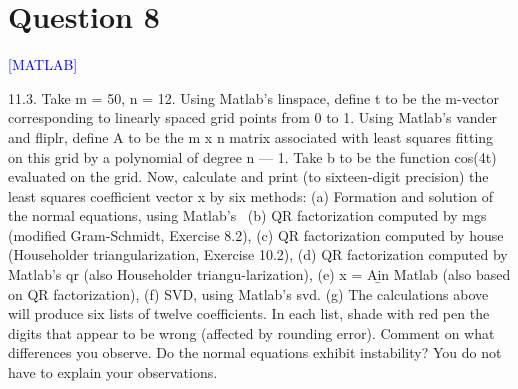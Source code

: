 \section*{Question 8}
\textcolor{blue}{[MATLAB]}

11.3. Take m = 50, n = 12. Using Matlab's linspace, define t to be the m-vector corresponding to linearly spaced grid points from 0 to 1. Using Matlab's vander and fliplr, define A to be the m x n matrix associated with least squares fitting on this grid by a polynomial of degree n — 1. Take b to be the function cos(4t) evaluated on the grid. Now, calculate and print (to sixteen-digit precision) the least squares coefficient vector x by six methods: (a) Formation and solution of the normal equations, using Matlab's \, (b) QR factorization computed by mgs (modified Gram-Schmidt, Exercise 8.2), (c) QR factorization computed by house (Householder triangularization, Exercise 10.2),
(d) QR factorization computed by Matlab's qr (also Householder triangu-larization),
(e) x = A\b in Matlab (also based on QR factorization),
(f) SVD, using Matlab's svd.
(g) The calculations above will produce six lists of twelve coefficients. In each list, shade with red pen the digits that appear to be wrong (affected by rounding error). Comment on what differences you observe. Do the normal equations exhibit instability? You do not have to explain your observations.